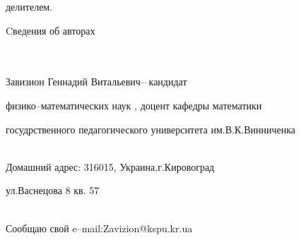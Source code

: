 делителем.








\newpage


\centerline{Cведения об авторах}


\\\\ Завизион Геннадий Витальевич-- кандидат


физико--математических наук , доцент кафедры математики


госудрственного педагогического университета им.В.К.Винниченка


\\ Домашний адрес: 316015, Украина,г.Кировоград


 ул.Васнецова 8 кв. 57


\\Сообщаю свой e--mail:Zavizion@kspu.kr.ua




















